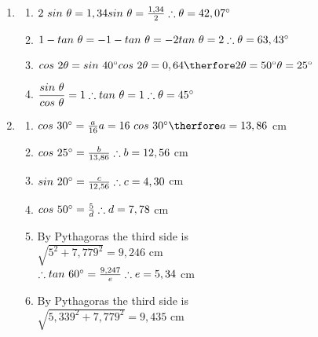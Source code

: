 \begin{eocsolutions}{}
{\begin{enumerate}[itemsep=6pt, label=\textbf{\arabic*}. ]
\item    
\begin{multicols}{2}
 \begin{enumerate}[itemsep=3pt, label=\textbf{(\alph*)} ]
     \item $2 ~sin~\theta= 1,34\\sin~\theta=\frac{1,34}{2}\\\therefore \theta=42,07^{\circ}$%
    \item $1-tan~\theta = -1\\ -tan~\theta = -2\\tan~\theta = 2\\ \therefore \theta=63,43^{\circ}$%
    \item $cos~2\theta = sin~40^{\circ}\\ cos~2\theta = 0,64\\ \therfore 2\theta = 50^{\circ}\\ \theta = 25^{\circ}$%
    \item $\dfrac{sin~\theta}{cos~\theta} = 1\\ \therefore tan~\theta = 1\\ \therefore \theta=45^{\circ}$%
    \end{enumerate}
\end{multicols}
\item 
\begin{multicols}{2}
    \begin{enumerate}[itemsep=3pt, label=\textbf{(\alph*)} ]
\item$cos~30^{\circ} =\frac{a}{16}\\ a = 16~cos~30^{\circ} \\ \therfore a=13,86$ cm
\item$cos~25^{\circ} =\frac{b}{13,86}\\\therefore b=12,56$ cm
\item$sin~20^{\circ} =\frac{c}{12,56}\\ \therefore c=4,30$ cm
\item$cos~50^{\circ} =\frac{5}{d} \\ \therefore d=7,78$ cm
\item By Pythagoras the third side is \\$\sqrt{5^2 + 7,779^2} = 9,246$ cm\\

$\therefore tan~60^{\circ} = \frac{9,247}{e}\\ \therefore e=5,34$ cm
\item By Pythagoras the third side is \\$\sqrt{5,339^2 + 7,779^2} = 9,435$ cm\\


\end{enumerate}
\end{multicols}
\end{enumerate}}
\end{eocsolutions}
